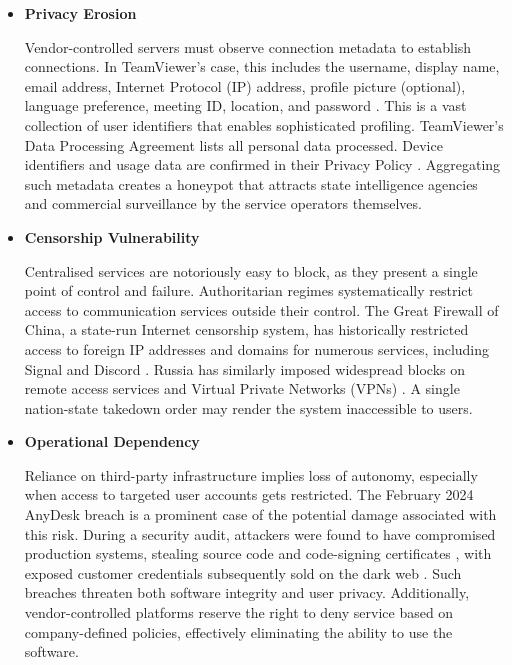 \documentclass[12pt,a4paper]{article}
\begin{document}
\begin{itemize}

\item \textbf{Privacy Erosion}

Vendor-controlled servers must observe connection metadata to establish connections. In TeamViewer’s case, this includes the username, display name, email address, Internet Protocol (IP) address, profile picture (optional), language preference, meeting ID, location, and password \cite{teamviewerdpa}. This is a vast collection of user identifiers that enables sophisticated profiling. TeamViewer’s Data Processing Agreement lists all personal data processed. Device identifiers and usage data are confirmed in their Privacy Policy \cite{teamviewerprivacy}. Aggregating such metadata creates a honeypot that attracts state intelligence agencies and commercial surveillance by the service operators themselves.

\item \textbf{Censorship Vulnerability}

Centralised services are notoriously easy to block, as they present a single point of control and failure. Authoritarian regimes systematically restrict access to communication services outside their control. The Great Firewall of China, a state-run Internet censorship system, has historically restricted access to foreign IP addresses and domains for numerous services, including Signal and Discord \cite{signalchina,discordchina}. Russia has similarly imposed widespread blocks on remote access services and Virtual Private Networks (VPNs) \cite{reutersvpn,roskomnadzor}. A single nation-state takedown order may render the system inaccessible to users.

\item \textbf{Operational Dependency}

Reliance on third-party infrastructure implies loss of autonomy, especially when access to targeted user accounts gets restricted. The February 2024 AnyDesk breach \cite{anydesk2024} is a prominent case of the potential damage associated with this risk. During a security audit, attackers were found to have compromised production systems, stealing source code and code-signing certificates \cite{akamaianydesk,cyberreasonanydesk}, with exposed customer credentials subsequently sold on the dark web \cite{resecurityanydesk,secboulevardanydesk}. Such breaches threaten both software integrity and user privacy. Additionally, vendor-controlled platforms reserve the right to deny service based on company-defined policies, effectively eliminating the ability to use the software.

\end{itemize}
\end{document}
